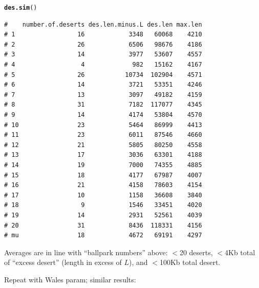 \documentclass{article}\usepackage[]{graphicx}\usepackage[]{color}
\makeatletter
\newcommand{\hlstd}[1]{\textcolor[rgb]{0.345,0.345,0.345}{#1}}%
\newcommand{\hlkwd}[1]{\textcolor[rgb]{0.737,0.353,0.396}{\textbf{#1}}}%
\newenvironment{kframe}{%
 \def\at@end@of@kframe{}%
 \ifinner\ifhmode%
  \def\at@end@of@kframe{\end{minipage}}%
  \begin{minipage}{\columnwidth}%
 \fi\fi%
 \def\FrameCommand##1{\hskip\@totalleftmargin \hskip-\fboxsep
 \colorbox{shadecolor}{##1}\hskip-\fboxsep
     \hskip-\linewidth \hskip-\@totalleftmargin \hskip\columnwidth}%
 \MakeFramed {\advance\hsize-\width
   \@totalleftmargin\z@ \linewidth\hsize
   \@setminipage}}%
 {\par\unskip\endMakeFramed%
 \at@end@of@kframe}
\newenvironment{knitrout}{}{} %
\makeatother
\begin{document}
\begin{knitrout}
\begin{kframe}
\begin{alltt}
\hlkwd{des.sim}\hlstd{()}
\end{alltt}
\begin{verbatim}
#    number.of.deserts des.len.minus.L des.len max.len
# 1                 16            3348   60068    4210
# 2                 26            6506   98676    4186
# 3                 14            3977   53607    4557
# 4                  4             982   15162    4167
# 5                 26           10734  102904    4571
# 6                 14            3721   53351    4246
# 7                 13            3097   49182    4159
# 8                 31            7182  117077    4345
# 9                 14            4174   53804    4570
# 10                23            5464   86999    4413
# 11                23            6011   87546    4660
# 12                21            5805   80250    4558
# 13                17            3036   63301    4188
# 14                19            7000   74355    4885
# 15                18            4177   67987    4007
# 16                21            4158   78603    4154
# 17                10            1158   36608    3840
# 18                 9            1546   33451    4020
# 19                14            2931   52561    4039
# 20                31            8436  118331    4156
# mu                18            4672   69191    4297
\end{verbatim}
\end{kframe}
\end{knitrout}

Averages are in line with ``ballpark numbers'' above: $<$20 deserts, $<$4Kb total of ``excess desert'' (length in excess of $L$), and $<$100Kb total desert. 

Repeat with Wales param; similar results:
\end{document}
